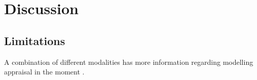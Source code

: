 \section{Discussion}

\subsection{Limitations}
A combination of different modalities has more information regarding modelling appraisal in the moment \cite{hall2007sources}.